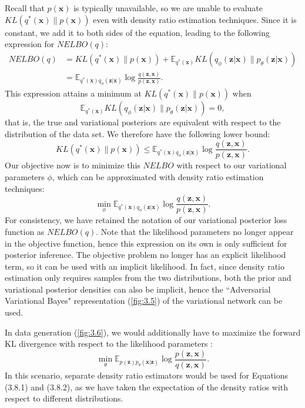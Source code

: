 \documentclass[honours,12pt]{unswthesis}
\numberwithin{equation}{section}
\theoremstyle{definition}
\begin{document}
Recall that $p(\bm{x})$ is typically unavailable, so we are unable to evaluate $KL(q^*(\bm{x})\|p(\bm{x}))$ even with density ratio estimation techniques. Since it is constant, we add it to both sides of the equation, leading to the following expression for $NELBO(q)$:
\begin{align*}
NELBO(q) &= KL(q^*(\bm{x})\|p(\bm{x}))+\mathbb{E}_{q^*(\bm{x})}KL(q_\phi(\bm{z}|\bm{x})\|p_\theta(\bm{z}|\bm{x}))\\
&=\mathbb{E}_{q^*(\bm{x})q_\phi(\bm{z}|\bm{x})}\log \frac{q(\bm{z},\bm{x})}{p(\bm{z},\bm{x})}.
\end{align*}
This expression attains a minimum at $KL(q^*(\bm{x})\|p(\bm{x}))$ when \[\mathbb{E}_{q^*(\bm{x})}KL(q_\phi(\bm{z}|\bm{x})\|p_\theta(\bm{z}|\bm{x}))=0,\] that is, the true and variational posteriors are equivalent with respect to the distribution of the data set. We therefore have the following lower bound:
\[KL(q^*(\bm{x})\|p(\bm{x}))\leq \mathbb{E}_{q^*(\bm{x})q_\phi(\bm{z}|\bm{x})}\log \frac{q(\bm{z},\bm{x})}{p(\bm{z},\bm{x})}.\]
Our objective now is to minimize this $NELBO$ with respect to our variational parameters $\phi$, which can be approximated with density ratio estimation techniques:
\begin{equation}
\min_\phi \mathbb{E}_{q^*(\bm{x})q_\phi(\bm{z}|\bm{x})}\log \frac{q(\bm{z},\bm{x})}{p(\bm{z},\bm{x})}.
\end{equation}
For consistency, we have retained the notation of our variational posterior loss function as $NELBO(q)$. Note that the likelihood parameters no longer appear in the objective function, hence this expression on its own is only sufficient for posterior inference. The objective problem no longer has an explicit likelihood term, so it can be used with an implicit likelihood. In fact, since density ratio estimation only requires samples from the two distributions, both the prior and variational posterior densities can also be implicit, hence the ``Adversarial Variational Bayes" representation (\autoref{fig:3.5}) of the variational network can be used.

In data generation (\autoref{fig:3.6}), we would additionally have to maximize the forward KL divergence with respect to the likelihood parameters \citep{tiao}:
\begin{equation}
\min_\theta \mathbb{E}_{p(\bm{z})p_\theta(\bm{x}|\bm{z})}\log \frac{p(\bm{z},\bm{x})}{q(\bm{z},\bm{x})}.
\end{equation}
In this scenario, separate density ratio estimators would be used for Equations (3.8.1) and (3.8.2), as we have taken the expectation of the density ratios with respect to different distributions.
\end{document}
